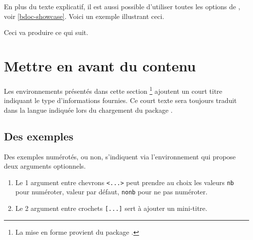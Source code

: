 

\begin{bdocexa}
    En plus du texte explicatif, il est aussi possible d'utiliser toutes les options de , voir \ref{bdoc-showcase}.
    Voici un exemple illustrant ceci.

    \medskip


    \medskip

    Ceci va produire ce qui suit.

    \medskip

    \begin{bdoc-doc-showcase}
        
    \end{bdoc-doc-showcase}
\end{bdocexa}


\section{Mettre en avant du contenu}

\begin{bdocnote}
    Les environnements présentés dans cette section
    \footnote{
        La mise en forme provient du package .
    }
    ajoutent un court titre indiquant le type d'informations fournies.
    Ce court texte sera toujours traduit dans la langue indiquée lors du chargement du package .
\end{bdocnote}




\subsection{Des exemples}

Des exemples numérotés, ou non, s'indiquent via l'environnement  qui propose deux arguments optionnels.

\begin{enumerate}
    \item Le 1\ier{} argument entre chevrons \verb#<...># peut prendre au choix les valeurs \verb#nb# pour numéroter, valeur par défaut, \verb#nonb# pour ne pas numéroter.

    \item Le 2\ieme{} argument entre crochets \verb#[...]# sert à ajouter un mini-titre.
\end{enumerate}


